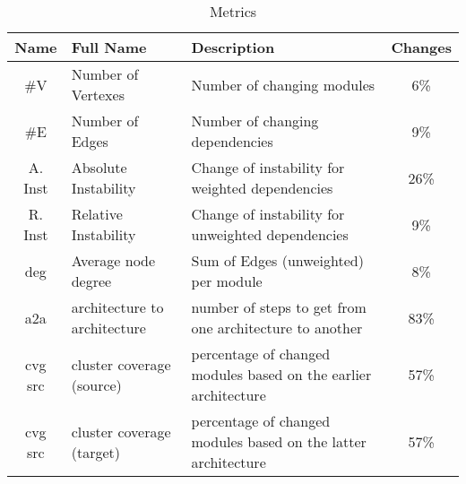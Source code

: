 \begin{table*}
	\caption{Metrics}
	\label{tableMetric}
	\centering
	\begin{tabular}{ | c | l | l | c |  }
		\hline
		Name & Full Name & Description & Changes \\
		\hline
		\#V & Number of Vertexes & Number of changing modules & 6\%  \\
		\#E & Number of Edges & Number of changing dependencies & 9\% \\
		A. Inst & Absolute Instability & Change of instability for weighted dependencies & 26\% \\
		R. Inst & Relative Instability & Change of instability for unweighted dependencies & 9\% \\
		deg & Average node degree & Sum of Edges (unweighted) per module & 8\% \\
		a2a & architecture to architecture & number of steps to get from one architecture to another & 83\% \\
		cvg src & cluster coverage (source) & percentage of changed modules based on the earlier architecture & 57\% \\
		cvg src & cluster coverage (target) & percentage of changed modules based on the latter architecture & 57\% \\
		\hline
	\end{tabular}
\end{table*}
